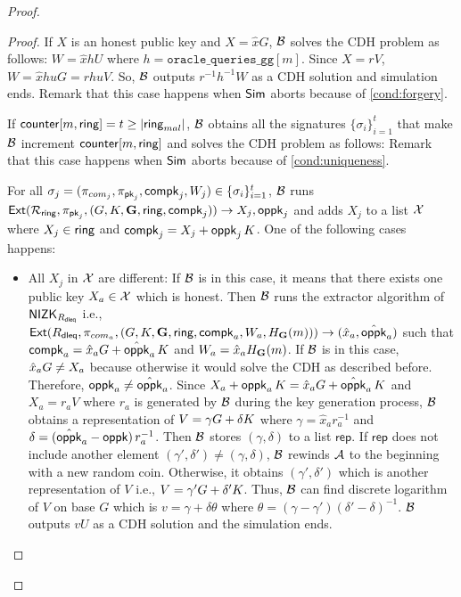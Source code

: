 \begin{proof}
\begin{proof}
			If $ X  $ is an honest public key and $ X = \hat{x}G $, $ \mathcal{B} $ solves the CDH problem as follows: $ W = \hat{x} h U $ where $ h = \mathtt{oracle\_queries\_gg}[m] $. Since $ X = r V $, $ W = \hat{x}huG =rhuV $. So, $ \mathcal{B} $ outputs $ r^{-1}h^{-1}W $ as a CDH solution and simulation ends. Remark that this case happens when $ \mathsf{Sim} $ aborts because of \ref{cond:forgery}.
			
			If $  \mathsf{counter}[m,\mathsf{ring}] = t \geq |\mathsf{ring}_{mal}| $, $ \mathcal{B} $ obtains all the signatures $ \{\sigma_i\}_{i =1}^t $ that make $ \mathcal{B} $ increment $ \mathsf{counter}[m,\mathsf{ring}] $ and solves the CDH problem as follows: Remark that this case happens when $ \mathsf{Sim} $ aborts because of \ref{cond:uniqueness}.
			
			For all $ \sigma_j = (\pi_{com_j},\pi_{\mathsf{pk}_j},\mathsf{compk}_j,W_j) \in \{\sigma_i\}_{i =1}^t $, $ \mathcal{B} $ runs $ \mathsf{Ext}(\mathcal{R}_{\mathsf{ring}},\pi_{\mathsf{pk}_j},(G,K,{\mathbf{G}},\mathsf{ring}, \mathsf{compk}_j) ) \rightarrow X_j, \mathsf{oppk}_j$ and adds $ X_j $ to a list $ {\mathcal{X}}  $ where $ X_j\in \mathsf{ring} $ and $ \mathsf{compk}_j = X_j + \mathsf{oppk}_j \,K $. One of the following cases happens:
			
			\begin{itemize}
				\item All $ X_j$ in $ {\mathcal{X}} $ are different: If $ \mathcal{B} $ is in this case, it means that there exists one public key $ X_a \in {\ensuremath{\mathcal{X}}} $ which is honest. Then $ \mathcal{B} $ runs the extractor algorithm of $ {\mathsf{NIZK}}_{R_{\mathsf{dleq}}} $ i.e., $ \mathsf{Ext}(R_{\mathsf{dleq}},\pi_{com_a},(G,K,{\mathbf{G}},\mathsf{ring}, \mathsf{compk}_a,W_a,H_{\mathbf{G}}(m))) \rightarrow (\hat{x}_a,\hat{\mathsf{oppk}}_a )$ such that $ \mathsf{compk}_a = \hat{x}_aG + \hat{\mathsf{oppk}}_a \,K $ and $ W_a = \hat{x}_a H_{\mathbf{G}}(m) $.  If $ \mathcal{B} $ is in this case, $ \hat{x}_aG\neq X_a $ because otherwise it would solve the CDH as described before. Therefore, $ \mathsf{oppk}_a \neq \hat{\mathsf{oppk}}_a $. Since $ X_a + \mathsf{oppk}_a \, K = \hat{x}_aG + \hat{\mathsf{oppk}}_a \,K  $ and $ X_a = r_aV $ where $ r_a $ is generated by $ \mathcal{B} $ during the key generation process, $ \mathcal{B} $ obtains a representation of $ V = \gamma G + \delta K $ where $ \gamma = \hat{x}_ar^{-1}_a  $ and $ \delta = (\hat{\mathsf{oppk}}_a -\mathsf{oppk})\,r_a^{-1} $. Then $ \mathcal{B} $ stores $ (\gamma, \delta) $ to a list $ \mathsf{rep} $. If $ \mathsf{rep} $ does not include another element $ (\gamma', \delta')  \neq (\gamma, \delta) $, $ \mathcal{B} $ rewinds $ \mathcal{A} $ to the beginning with a new random coin.  Otherwise, it obtains $ (\gamma', \delta') $ which is another representation of $ V $ i.e., $ V = \gamma' G + \delta' K $. Thus, $ \mathcal{B} $ can find discrete logarithm of $ V $ on base $ G $ which is $ v = \gamma + \delta \theta $ where $ \theta = (\gamma - \gamma')(\delta' - \delta)^{-1} $. $ \mathcal{B} $ outputs $ vU $ as a CDH solution and the simulation ends.
				

\end{itemize}
\end{proof}
\end{proof}
